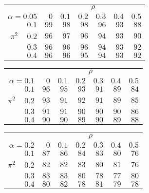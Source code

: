 \begin{tabular}{r|rrrrrr}
\hline\hline
 &\multicolumn{6}{c}{$\rho$} \\ 
 $\alpha = 0.05$ & $0$ & $0.1$ & $0.2$ & $0.3$ & $0.4$ & $0.5$ \\ 
 \hline$0.1$ & $99$ & $98$ & $98$ & $96$ & $93$ & $88$\\ 
$\pi^2\;\;\;$ $0.2$ & $96$ & $97$ & $96$ & $94$ & $93$ & $90$\\ 
$0.3$ & $96$ & $96$ & $96$ & $94$ & $93$ & $92$\\ 
$0.4$ & $96$ & $96$ & $95$ & $94$ & $93$ & $92$\\ 
 \hline 
 \end{tabular}
 
 \vspace{2em} 
 
\begin{tabular}{r|rrrrrr}
\hline\hline
 &\multicolumn{6}{c}{$\rho$} \\ 
 $\alpha = 0.1$ & $0$ & $0.1$ & $0.2$ & $0.3$ & $0.4$ & $0.5$ \\ 
 \hline$0.1$ & $96$ & $95$ & $93$ & $91$ & $89$ & $84$\\ 
$\pi^2\;\;\;$ $0.2$ & $93$ & $91$ & $92$ & $91$ & $89$ & $85$\\ 
$0.3$ & $91$ & $91$ & $90$ & $90$ & $90$ & $86$\\ 
$0.4$ & $90$ & $90$ & $89$ & $90$ & $89$ & $88$\\ 
 \hline 
 \end{tabular}
 
 \vspace{2em} 
 
\begin{tabular}{r|rrrrrr}
\hline\hline
 &\multicolumn{6}{c}{$\rho$} \\ 
 $\alpha = 0.2$ & $0$ & $0.1$ & $0.2$ & $0.3$ & $0.4$ & $0.5$ \\ 
 \hline$0.1$ & $87$ & $86$ & $84$ & $83$ & $80$ & $76$\\ 
$\pi^2\;\;\;$ $0.2$ & $82$ & $82$ & $83$ & $80$ & $81$ & $76$\\ 
$0.3$ & $83$ & $83$ & $80$ & $78$ & $77$ & $80$\\ 
$0.4$ & $80$ & $82$ & $78$ & $81$ & $79$ & $78$\\ 
 \hline 
 \end{tabular}